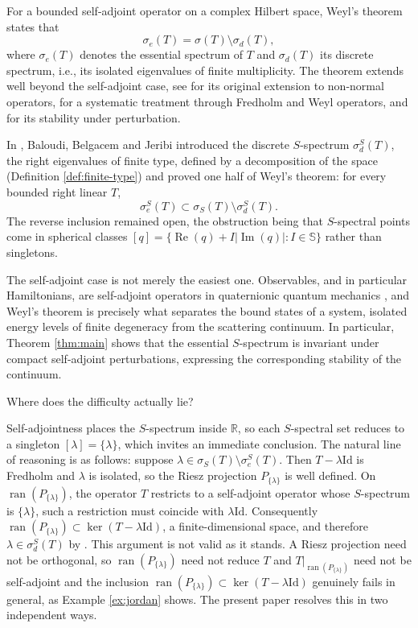 \documentclass[12pt,a4paper]{article}
\theoremstyle{plain}
\theoremstyle{definition}
\theoremstyle{remark}
\newcommand{\RR}{\mathbb R}
\newcommand{\Id}{\mathrm{Id}}
\newcommand{\sphere}{\mathbb S}
\newcommand{\sigS}{\sigma_S}
\newcommand{\sigeS}{\sigma_{e}^{S}}
\newcommand{\sigdS}{\sigma_{d}^{S}}
\DeclareMathOperator{\ran}{ran}
\DeclareMathOperator{\Rea}{Re}
\DeclareMathOperator{\Ima}{Im}
\begin{document}
{For a bounded self-adjoint operator on a complex Hilbert space, Weyl's
theorem \cite{Weyl1909} states that
$$\sigma_e(T)=\sigma(T)\setminus\sigma_d(T),$$ where $\sigma_e(T)$
denotes the essential spectrum of $T$ and $\sigma_d(T)$ its discrete
spectrum, i.e., its isolated eigenvalues of finite multiplicity. The
theorem extends well beyond the self-adjoint case, see \cite{COB} for
its original extension to non-normal operators, \cite{HAR} for a
systematic treatment through Fredholm and Weyl operators, and
\cite{OUD} for its stability under perturbation.

In \cite{BaloudiBelgacemJeribi2022}, Baloudi, Belgacem and Jeribi
introduced the discrete $S$-spectrum $\sigdS(T)$, the right
eigenvalues of finite type, defined by a decomposition of the space
(Definition \ref{def:finite-type}) and proved one half of Weyl's
theorem: for every bounded right linear $T$,
\begin{equation}
 \sigeS(T)\subset\sigS(T)\setminus\sigdS(T).
 \label{eq:inclusion}
\end{equation}
The reverse inclusion remained open, the obstruction being that
$S$-spectral points come in spherical classes
$[q]=\{\Rea(q)+I|\Ima(q)|:I\in\sphere\}$ rather than singletons.

The self-adjoint case is not merely the easiest one. Observables, and
in particular Hamiltonians, are self-adjoint operators in quaternionic
quantum mechanics \cite{Adler1995}, and Weyl's theorem is precisely
what separates the bound states of a system, isolated energy levels
of finite degeneracy from the scattering continuum. In particular,
Theorem \ref{thm:main} shows that the essential $S$-spectrum is
invariant under compact self-adjoint perturbations, expressing the
corresponding stability of the continuum.
\begin{center}
Where does the difficulty actually lie?
\end{center}

Self-adjointness places the $S$-spectrum inside $\RR$, so each
$S$-spectral set reduces to a singleton $[\lambda]=\{\lambda\}$,
which invites an immediate conclusion. The natural line of reasoning is
as follows: suppose \(\lambda\in\sigS(T)\setminus\sigeS(T)\). Then
\(T-\lambda\Id\) is Fredholm and \(\lambda\) is isolated, so the Riesz
projection \(P_{\{\lambda\}}\) is well defined. On
\(\ran(P_{\{\lambda\}})\), the operator \(T\) restricts to a
self-adjoint operator whose \(S\)-spectrum is \(\{\lambda\}\), such a
restriction must coincide with \(\lambda\Id\). Consequently
\(\ran(P_{\{\lambda\}})\subset\ker(T-\lambda\Id)\), a finite-dimensional
space, and therefore \(\lambda\in\sigdS(T)\) by
\cite[Theorem 3.10]{BaloudiBelgacemJeribi2022}. This argument is not valid as it stands. A Riesz projection need
not be orthogonal, so $\ran(P_{\{\lambda\}})$ need not reduce $T$ and
$T|_{\ran(P_{\{\lambda\}})}$ need not be self-adjoint and the
inclusion $\ran(P_{\{\lambda\}})\subset\ker(T-\lambda\Id)$ genuinely
fails in general, as Example \ref{ex:jordan} shows. The present paper
resolves this in two independent ways.

}
\end{document}
